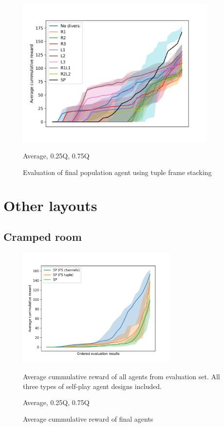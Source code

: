 \begin{figure}[!ht]
    \centering
    \includegraphics*[width=10cm]{../img/FinalPopFinalPopFsTupleAvg.png}

    \caption{Evaluation of final population agent using tuple frame stacking}
    \label{FinalPopFinalPopFsTupleAvg}
    \medskip
    \small 

    Average, 0.25Q, 0.75Q

\end{figure}

\newpage

\section{Other layouts}
\subsection{Cramped room}
\begin{figure}[!ht]
    \centering
    \includegraphics*[width=8cm]{../img/CrampedRoomFSVariantsOrderedAvg.png}

    \caption{Average cummulative reward of final agents}
    \label{CrampedRoomFSVariantsOrderedAvg}
    \medskip
    \small 
    Average cummulative reward of all agents from evaluation set.
    All three types of self-play agent designs included.

    Average, 0.25Q, 0.75Q

\end{figure}


